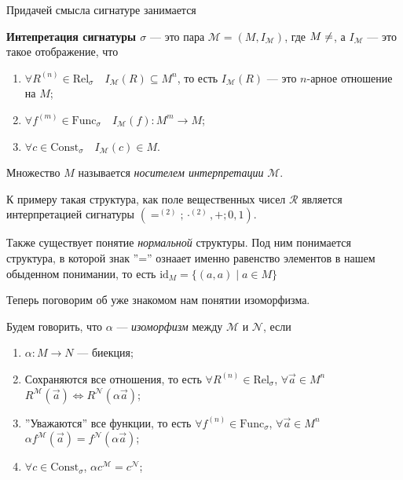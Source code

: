 \documentclass[a4paper, fleqn]{article}
\begin{document}
    Придачей смысла сигнатуре занимается
    \begin{definition}
        \textbf{Интепретация сигнатуры $\sigma$} --- это пара $\mathcal{M} = (M, I_\mathcal{M})$,
        где $M \neq \empty$, а $I_\mathcal{M}$ --- это такое отображение, что
        \begin{enumerate}
            \item $\forall R^{(n)} \in \text{Rel}_\sigma \quad I_{\mathcal{M}}(R) \subseteq M^{n}$, 
            то есть $I_{\mathcal{M}}(R)$ --- это $n$-арное отношение на $M$;
            \item $\forall f^{(m)} \in \text{Func}_\sigma \quad I_{\mathcal{M}}(f) \colon M^{m} \to M$;
            \item $\forall c \in \text{Const}_\sigma \quad I_{\mathcal{M}}(c) \in M$.
        \end{enumerate}
        Множество $M$ называется {\it носителем интерпретации} $\mathcal{M}$.
    \end{definition}

    К примеру такая структура, как поле вещественных чисел $\mathcal{R}$ является интерпретацией
    сигнатуры $(=^{(2)};\cdot^{(2)}, +;0,1)$.

    Также существует понятие \textit{нормальной} структуры. Под ним понимается структура, в которой
    знак ''='' ознаает именно равенство элементов в нашем обыденном понимании, то есть 
    $\text{id}_M = \{(a, a) \mid a \in M\}$

    Теперь поговорим об уже знакомом нам понятии изоморфизма.

    \begin{definition} \label{def::isomorphism-on-structures}
        Будем говорить, что $\alpha$ --- {\it изоморфизм} между $\mathcal{M}$ и $\mathcal{N}$, если
        \begin{enumerate}
            \item $\alpha \colon M \to N$ --- биекция;
            \item Сохраняются все отношения, то есть $\forall R^{(n)} \in \text{Rel}_{\sigma}$, $\forall \vec{a} \in M^{n}$ $R^{\mathcal{M}}(\vec{a}) \iff R^{\mathcal{N}}(\alpha \vec{a})$;
            \item ''Уважаются'' все функции, то есть $\forall f^{(n)} \in \text{Func}_{\sigma}$, $\forall \vec{a} \in M^{n}$ $\alpha f^{\mathcal{M}}(\vec{a}) = f^{\mathcal{N}}(\alpha \vec{a})$;
            \item $\forall c \in \text{Const}_{\sigma}$, $\alpha c^{\mathcal{M}} = c^{\mathcal{N}}$;
        \end{enumerate}
    \end{definition}
    
\end{document}
